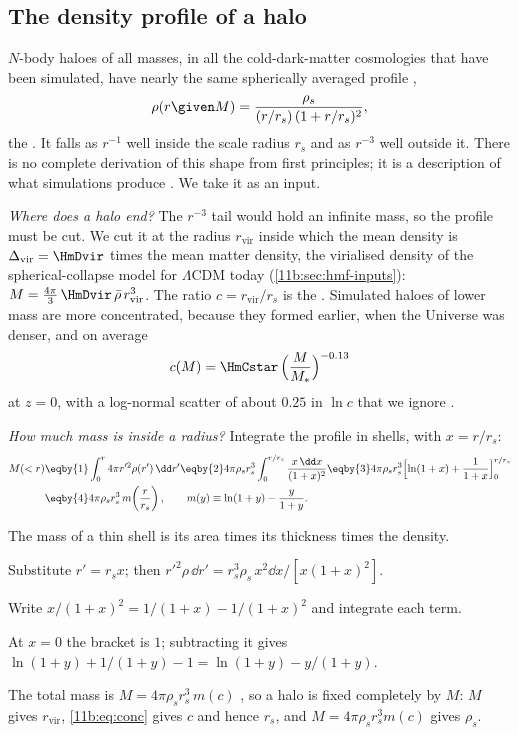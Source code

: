 \subsection{The density profile of a halo}
\label{11b:sec:nfw}

$N$-body haloes of all masses, in all the cold-dark-matter cosmologies that have
been simulated, have nearly the same spherically averaged profile
\cite{NFW1997},
\begin{equation}
  \rho(r\given M)=\frac{\rho_s}{(r/r_s)\,(1+r/r_s)^2},
  \label{11b:eq:nfw}
\end{equation}
the . It falls as $r^{-1}$ well inside the scale radius $r_s$
and as $r^{-3}$ well outside it. There is no complete derivation of this shape
from first principles; it is a description of what simulations produce
. We take it as an input.

\emph{Where does a halo end?} The $r^{-3}$ tail would hold an infinite mass, so
the profile must be cut. We cut it at the radius $r_{\mathrm{vir}}$ inside which
the mean density is $\Delta_{\mathrm{vir}}=\HmDvir$ times the mean matter density,
the virialised density of the spherical-collapse model for $\Lambda$CDM today
(\cref{11b:sec:hmf-inputs}):
$M=\frac{4\pi}{3}\,\HmDvir\,\bar\rho\,r_{\mathrm{vir}}^3$. The ratio
$c=r_{\mathrm{vir}}/r_s$ is the . Simulated haloes of lower
mass are more concentrated, because they formed earlier, when the Universe was
denser, and on average
\begin{equation}
  c(M)=\HmCstar\,\Bigl(\frac{M}{M_*}\Bigr)^{-0.13}
  \label{11b:eq:conc}
\end{equation}
at $z=0$, with a log-normal scatter of about $0.25$ in $\ln c$ that we ignore
.

\emph{How much mass is inside a radius?} Integrate the profile in shells, with
$x=r/r_s$:
\begin{align}
  M(<r)
  &\eqby{1}\int_0^r4\pi r'^2\rho(r')\,\dd r'
   \eqby{2}4\pi\rho_sr_s^3\int_0^{r/r_s}\frac{x\,\dd x}{(1+x)^2}
   \eqby{3}4\pi\rho_sr_s^3\Bigl[\ln(1+x)+\frac1{1+x}\Bigr]_0^{r/r_s}\nonumber\\
  &\eqby{4}4\pi\rho_sr_s^3\,m\!\left(\frac{r}{r_s}\right),
  \qquad m(y)\equiv\ln(1+y)-\frac{y}{1+y} .
  \label{11b:eq:nfw-mass}
\end{align}
\begin{explain}
  \item The mass of a thin shell is its area times its thickness times the
        density.
  \item Substitute $r'=r_sx$; then $r'^2\rho\,\dd r'=r_s^3\rho_s\,x^2\dd x/[x(1+x)^2]$.
  \item Write $x/(1+x)^2=1/(1+x)-1/(1+x)^2$ and integrate each term.
  \item At $x=0$ the bracket is $1$; subtracting it gives
        $\ln(1+y)+1/(1+y)-1=\ln(1+y)-y/(1+y)$.
\end{explain}
The total mass is $M=4\pi\rho_sr_s^3\,m(c)$ , so
a halo is fixed completely by $M$: $M$ gives $r_{\mathrm{vir}}$, \eqref{11b:eq:conc}
gives $c$ and hence $r_s$, and $M=4\pi\rho_sr_s^3m(c)$ gives $\rho_s$.

